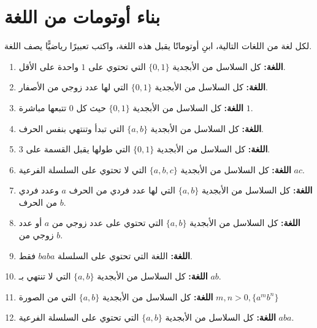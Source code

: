 \documentclass[12pt]{article}
\begin{document}
\begin{enumerate}[itemsep=3em]
\begin{enumerate}[itemsep=3em]
\begin{enumerate}
\end{enumerate}


\clearpage
\section{بناء أوتومات من اللغة}

لكل لغة من اللغات التالية، ابنِ أوتوماتًا يقبل هذه اللغة، واكتب تعبيرًا رياضيًّا يصف اللغة.

\begin{enumerate}

\item
\textbf{اللغة:} كل السلاسل من الأبجدية $\{0, 1\}$ التي تحتوي على $1$ واحدة على الأقل.

\item
\textbf{اللغة:} كل السلاسل من الأبجدية $\{0, 1\}$ التي لها عدد زوجي من الأصفار.

\item
\textbf{اللغة:} كل السلاسل من الأبجدية $\{0, 1\}$ حيث كل $0$ تتبعها مباشرة $1$.

\item
\textbf{اللغة:} كل السلاسل من الأبجدية $\{a, b\}$ التي تبدأ وتنتهي بنفس الحرف.

\item
\textbf{اللغة:} كل السلاسل من الأبجدية $\{0, 1\}$ التي طولها يقبل القسمة على 3.

\item
\textbf{اللغة:} كل السلاسل من الأبجدية $\{a, b, c\}$ التي لا تحتوي على السلسلة الفرعية $ac$.

\item
\textbf{اللغة:} كل السلاسل من الأبجدية $\{a, b\}$ التي لها عدد فردي من الحرف $a$ وعدد فردي من الحرف $b$.

\item
\textbf{اللغة:} كل السلاسل من الأبجدية $\{a, b\}$ التي تحتوي على عدد زوجي من $a$ أو عدد زوجي من $b$.

\item
\textbf{اللغة:} اللغة التي تحتوي على السلسلة $baba$ فقط.

\item
\textbf{اللغة:} كل السلاسل من الأبجدية $\{a, b\}$ التي لا تنتهي بـ $ab$.

\item
\textbf{اللغة:} كل السلاسل من الأبجدية $\{a, b\}$ التي من الصورة $m,n>0, \{a^mb^n\}$

\item
\textbf{اللغة:} كل السلاسل من الأبجدية $\{a, b\}$ التي تحتوي على السلسلة الفرعية $aba$.


\end{enumerate}
\end{enumerate}
\end{enumerate}
\end{document}
